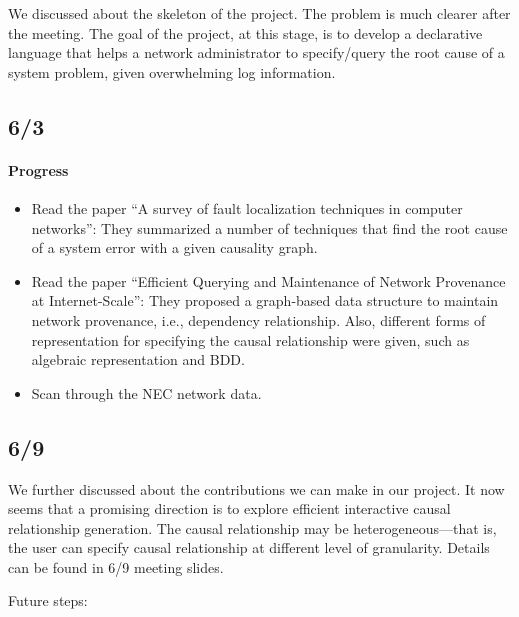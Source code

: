 \documentclass{article}
\begin{document}
We discussed about the skeleton of the project. The problem is much clearer
after the meeting. The goal of the project, at this stage, is to develop a
declarative language that helps a network administrator to specify/query the root cause of a
system problem, given overwhelming log information.

\subsection{6/3}
\label{sec:meeting:63}

\paragraph{Progress}
\begin{itemize}
\item Read the paper ``A survey of fault localization techniques in computer
networks'': They summarized a number of techniques that find the root cause of a
system error with a given causality graph. 

\item Read the paper ``Efficient Querying and Maintenance of Network Provenance at
Internet-Scale'': They proposed a graph-based data structure to maintain network
provenance, i.e., dependency relationship. Also, different forms of
representation for specifying the causal relationship were given, such as
algebraic representation and BDD.

\item Scan through the NEC network data.
\end{itemize}

\subsection{6/9}
\label{sec:meeting:69}

We further discussed about the contributions we can make in our project. It now
seems that a promising direction is to explore efficient interactive causal
relationship generation. The causal relationship may be heterogeneous---that is,
the user can specify causal relationship at different level of granularity. Details can be found in 6/9 meeting slides.

Future steps:
\end{document}
